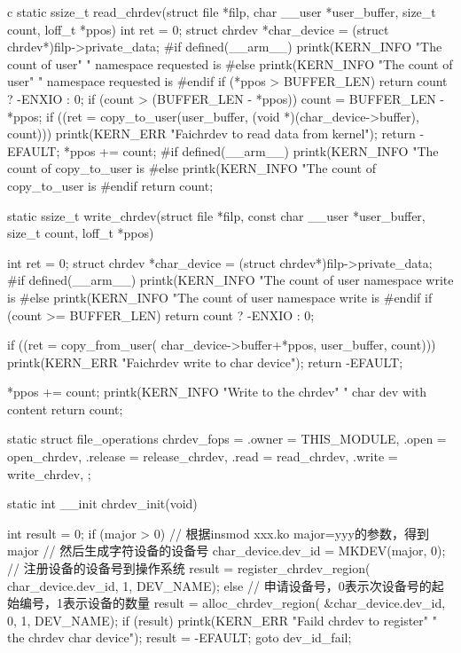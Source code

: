 \begin{code-block}{c}
static ssize_t read_chrdev(struct file *filp,
        char __user *user_buffer, size_t count, loff_t *ppos)
{
        int ret = 0;
        struct chrdev *char_device = (struct chrdev*)filp->private_data;
#if defined(__arm__)
        printk(KERN_INFO "The count of user"
                " namespace requested is %
#else
        printk(KERN_INFO "The count of user"
                " namespace requested is %
#endif
        if (*ppos > BUFFER_LEN) {
                return count ? -ENXIO : 0;
        }
        if (count > (BUFFER_LEN - *ppos)) {
                count = BUFFER_LEN - *ppos;
        }
        if ((ret = copy_to_user(user_buffer,
                (void *)(char_device->buffer), count))) {
                printk(KERN_ERR "Faichrdev to read data from kernel\n");
                return -EFAULT;
        }
        *ppos += count;
#if defined(__arm__)
        printk(KERN_INFO "The count of copy_to_user is %
#else
        printk(KERN_INFO "The count of copy_to_user is %
#endif
        return count;
}

static ssize_t write_chrdev(struct file *filp,
        const char __user *user_buffer, size_t count, loff_t *ppos)
{
        int ret = 0;
        struct chrdev *char_device = (struct chrdev*)filp->private_data;
#if defined(__arm__)
        printk(KERN_INFO
                "The count of user namespace write is %
#else
        printk(KERN_INFO
                "The count of user namespace write is %
#endif
        if (count >= BUFFER_LEN) {
                return count ? -ENXIO : 0;
        }

        if ((ret = copy_from_user(
                char_device->buffer+*ppos, user_buffer, count))) {
                printk(KERN_ERR "Faichrdev write to char device\n");
                return -EFAULT;
        }

        *ppos += count;
        printk(KERN_INFO "Write to the chrdev"
                " char dev with content %
        return count;
}

static struct file_operations chrdev_fops = {
        .owner   = THIS_MODULE,
        .open    = open_chrdev,
        .release = release_chrdev,
        .read    = read_chrdev,
        .write   = write_chrdev,
};

static int __init chrdev_init(void)
{
        int result = 0;
        if (major > 0) {
                // 根据insmod xxx.ko major=yyy的参数，得到major
                // 然后生成字符设备的设备号
                char_device.dev_id = MKDEV(major, 0);
                // 注册设备的设备号到操作系统
                result = register_chrdev_region(
                        char_device.dev_id, 1, DEV_NAME);
        } else {
                // 申请设备号，0表示次设备号的起始编号，1表示设备的数量
                result = alloc_chrdev_region(
                        &char_device.dev_id, 0, 1, DEV_NAME);
        }
        if (result) {
                printk(KERN_ERR
                        "Faild chrdev to register"
                        " the chrdev char device\n");
                result = -EFAULT;
                goto dev_id_fail;
        }

}
\end{code-block}
